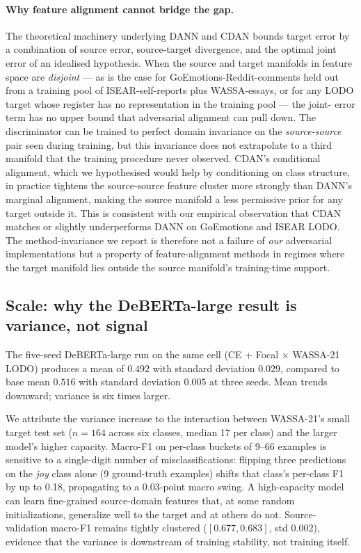 \paragraph{Why feature alignment cannot bridge the gap.}
The theoretical machinery underlying DANN and CDAN
\citep{ben2010theory,ganin2016dann} bounds target error by a
combination of source error, source-target divergence, and the
optimal joint error of an idealised hypothesis. When the source and
target manifolds in feature space are \emph{disjoint} — as is the case
for GoEmotions-Reddit-comments held out from a training pool of
ISEAR-self-reports plus WASSA-essays, or for any LODO target whose
register has no representation in the training pool — the joint-
error term has no upper bound that adversarial alignment can pull
down. The discriminator can be trained to perfect domain
invariance on the \emph{source-source} pair seen during training, but
this invariance does not extrapolate to a third manifold that the
training procedure never observed. CDAN's conditional alignment,
which we hypothesised would help by conditioning on class structure,
in practice tightens the source-source feature cluster more strongly
than DANN's marginal alignment, making the source manifold a less
permissive prior for any target outside it. This is consistent with
our empirical observation that CDAN matches or slightly underperforms
DANN on GoEmotions and ISEAR LODO. The method-invariance we report is
therefore not a failure of \emph{our} adversarial implementations but
a property of feature-alignment methods in regimes where the target
manifold lies outside the source manifold's training-time support.

\subsection{Scale: why the DeBERTa-large result is variance, not signal}
\label{sec:discussion:scale}

The five-seed DeBERTa-large run on the same cell (CE + Focal $\times$
WASSA-21 LODO) produces a mean of $0.492$ with standard deviation
$0.029$, compared to base mean $0.516$ with standard deviation
$0.005$ at three seeds. Mean trends downward; variance is six times
larger.

We attribute the variance increase to the interaction between
WASSA-21's small target test set ($n = 164$ across six classes,
median 17 per class) and the larger model's higher capacity. Macro-F1
on per-class buckets of 9--66 examples is sensitive to a single-digit
number of misclassifications: flipping three predictions on the
\emph{joy} class alone (9 ground-truth examples) shifts that class's
per-class F1 by up to 0.18, propagating to a 0.03-point macro swing.
A high-capacity model can learn fine-grained source-domain features
that, at some random initializations, generalize well to the target
and at others do not. Source-validation macro-F1 remains tightly
clustered ($[0.677, 0.683]$, std $0.002$), evidence that the variance
is downstream of training stability, not training itself.

